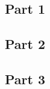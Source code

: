 \blindtext

\subsection{Part 1}

\blindtext

\subsection{Part 2}

\blindtext

\subsection{Part 3}

\blindtext
